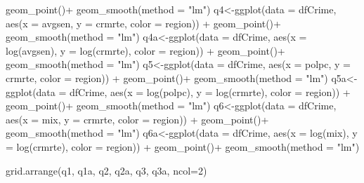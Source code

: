\documentclass[]{article}
\newenvironment{Shaded}{}{}
\newcommand{\DataTypeTok}[1]{#1}
\newcommand{\DecValTok}[1]{#1}
\newcommand{\KeywordTok}[1]{\textcolor[rgb]{0.00,0.00,1.00}{#1}}
\newcommand{\NormalTok}[1]{#1}
\newcommand{\OperatorTok}[1]{#1}
\newcommand{\StringTok}[1]{\textcolor[rgb]{0.00,0.50,0.50}{#1}}
\begin{document}
\begin{Shaded}
\begin{Highlighting}[]
\StringTok{      }\KeywordTok{geom_point}\NormalTok{()}\OperatorTok{+}
\StringTok{  }\KeywordTok{geom_smooth}\NormalTok{(}\DataTypeTok{method =} \StringTok{"lm"}\NormalTok{)}
\NormalTok{q4<-}\KeywordTok{ggplot}\NormalTok{(}\DataTypeTok{data =}\NormalTok{ dfCrime, }\KeywordTok{aes}\NormalTok{(}\DataTypeTok{x =}\NormalTok{ avgsen, }\DataTypeTok{y =}\NormalTok{ crmrte, }\DataTypeTok{color =}\NormalTok{ region)) }\OperatorTok{+}\StringTok{ }
\StringTok{      }\KeywordTok{geom_point}\NormalTok{()}\OperatorTok{+}
\StringTok{  }\KeywordTok{geom_smooth}\NormalTok{(}\DataTypeTok{method =} \StringTok{"lm"}\NormalTok{)}
\NormalTok{q4a<-}\KeywordTok{ggplot}\NormalTok{(}\DataTypeTok{data =}\NormalTok{ dfCrime, }\KeywordTok{aes}\NormalTok{(}\DataTypeTok{x =} \KeywordTok{log}\NormalTok{(avgsen), }\DataTypeTok{y =} \KeywordTok{log}\NormalTok{(crmrte), }\DataTypeTok{color =}\NormalTok{ region)) }\OperatorTok{+}\StringTok{ }
\StringTok{      }\KeywordTok{geom_point}\NormalTok{()}\OperatorTok{+}
\StringTok{  }\KeywordTok{geom_smooth}\NormalTok{(}\DataTypeTok{method =} \StringTok{"lm"}\NormalTok{)}
\NormalTok{q5<-}\KeywordTok{ggplot}\NormalTok{(}\DataTypeTok{data =}\NormalTok{ dfCrime, }\KeywordTok{aes}\NormalTok{(}\DataTypeTok{x =}\NormalTok{ polpc, }\DataTypeTok{y =}\NormalTok{ crmrte, }\DataTypeTok{color =}\NormalTok{ region)) }\OperatorTok{+}\StringTok{ }
\StringTok{      }\KeywordTok{geom_point}\NormalTok{()}\OperatorTok{+}
\StringTok{  }\KeywordTok{geom_smooth}\NormalTok{(}\DataTypeTok{method =} \StringTok{"lm"}\NormalTok{)}
\NormalTok{q5a<-}\KeywordTok{ggplot}\NormalTok{(}\DataTypeTok{data =}\NormalTok{ dfCrime, }\KeywordTok{aes}\NormalTok{(}\DataTypeTok{x =} \KeywordTok{log}\NormalTok{(polpc), }\DataTypeTok{y =} \KeywordTok{log}\NormalTok{(crmrte), }\DataTypeTok{color =}\NormalTok{ region)) }\OperatorTok{+}\StringTok{ }
\StringTok{      }\KeywordTok{geom_point}\NormalTok{()}\OperatorTok{+}
\StringTok{  }\KeywordTok{geom_smooth}\NormalTok{(}\DataTypeTok{method =} \StringTok{"lm"}\NormalTok{)}
\NormalTok{q6<-}\KeywordTok{ggplot}\NormalTok{(}\DataTypeTok{data =}\NormalTok{ dfCrime, }\KeywordTok{aes}\NormalTok{(}\DataTypeTok{x =}\NormalTok{ mix, }\DataTypeTok{y =}\NormalTok{ crmrte, }\DataTypeTok{color =}\NormalTok{ region)) }\OperatorTok{+}\StringTok{ }
\StringTok{      }\KeywordTok{geom_point}\NormalTok{()}\OperatorTok{+}
\StringTok{  }\KeywordTok{geom_smooth}\NormalTok{(}\DataTypeTok{method =} \StringTok{"lm"}\NormalTok{)}
\NormalTok{q6a<-}\KeywordTok{ggplot}\NormalTok{(}\DataTypeTok{data =}\NormalTok{ dfCrime, }\KeywordTok{aes}\NormalTok{(}\DataTypeTok{x =} \KeywordTok{log}\NormalTok{(mix), }\DataTypeTok{y =} \KeywordTok{log}\NormalTok{(crmrte), }\DataTypeTok{color =}\NormalTok{ region)) }\OperatorTok{+}\StringTok{ }
\StringTok{      }\KeywordTok{geom_point}\NormalTok{()}\OperatorTok{+}
\StringTok{  }\KeywordTok{geom_smooth}\NormalTok{(}\DataTypeTok{method =} \StringTok{"lm"}\NormalTok{)}

\KeywordTok{grid.arrange}\NormalTok{(q1, q1a, q2, q2a, q3, q3a, }\DataTypeTok{ncol=}\DecValTok{2}\NormalTok{)}
\end{Highlighting}
\end{Shaded}
\end{document}
